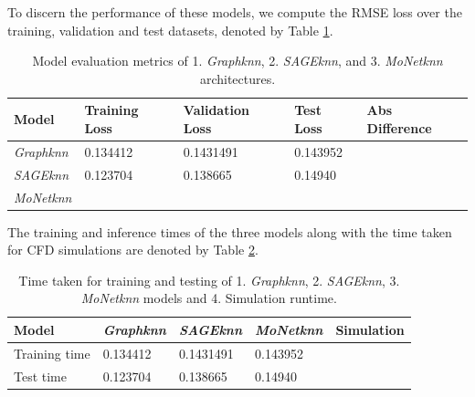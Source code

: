 To discern the performance of these models, we compute the \gls{RMSE} loss over the training, validation and test datasets, denoted by Table \ref{t:predloss}.
\begin{table}[ht]
    \centering
    \caption{Model evaluation metrics of  1. \textit{Graphknn}, 2. \textit{SAGEknn}, and 3. \textit{MoNetknn} architectures. } 
    \label{t:predloss}
    \begin{tabular}{|l|l|l|l|l|}
    \hline
    \textbf{Model} & \textbf{Training Loss} & \textbf{Validation Loss} & \textbf{Test Loss} & \textbf{Abs Difference} \\
    \hline
     \textit{Graphknn} & 0.134412& 0.1431491 & 0.143952 &  \\
    \hline
    \textit{SAGEknn}& 0.123704 & 0.138665 & 0.14940 & \\
    \hline
    \textit{MoNetknn} &  & &  &  \\
    \hline
    \end{tabular}
\end{table}

The training and inference times of the three models along with the time taken for CFD simulations are denoted by Table \ref{t:times}. 
\begin{table}[ht]
    \centering
    \caption{Time taken for training and testing of  1. \textit{Graphknn}, 2. \textit{SAGEknn}, 3. \textit{MoNetknn} models and 4. Simulation runtime.} 
    \label{t:times}
    \begin{tabular}{|l|l|l|l|l|}
    \hline
    \textbf{Model} & \textit{Graphknn} & \textit{SAGEknn} & \textit{MoNetknn} & Simulation\\
    \hline
    Training time & 0.134412& 0.1431491 & 0.143952 &  \\
    \hline
    Test time & 0.123704 & 0.138665 & 0.14940 & \\
    \hline
    \end{tabular}
\end{table}
